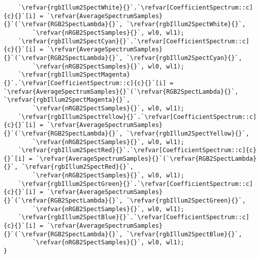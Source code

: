 \begin{lstlisting}
    `\refvar{rgbIllum2SpectWhite}{}`.`\refvar[CoefficientSpectrum::c]{c}{}`[i] = `\refvar{AverageSpectrumSamples}{}`(`\refvar{RGB2SpectLambda}{}`, `\refvar{rgbIllum2SpectWhite}{}`, 
        `\refvar{nRGB2SpectSamples}{}`, wl0, wl1);
    `\refvar{rgbIllum2SpectCyan}{}`.`\refvar[CoefficientSpectrum::c]{c}{}`[i] = `\refvar{AverageSpectrumSamples}{}`(`\refvar{RGB2SpectLambda}{}`, `\refvar{rgbIllum2SpectCyan}{}`, 
        `\refvar{nRGB2SpectSamples}{}`, wl0, wl1);
    `\refvar{rgbIllum2SpectMagenta}{}`.`\refvar[CoefficientSpectrum::c]{c}{}`[i] = `\refvar{AverageSpectrumSamples}{}`(`\refvar{RGB2SpectLambda}{}`, `\refvar{rgbIllum2SpectMagenta}{}`, 
        `\refvar{nRGB2SpectSamples}{}`, wl0, wl1);
    `\refvar{rgbIllum2SpectYellow}{}`.`\refvar[CoefficientSpectrum::c]{c}{}`[i] = `\refvar{AverageSpectrumSamples}{}`(`\refvar{RGB2SpectLambda}{}`, `\refvar{rgbIllum2SpectYellow}{}`, 
        `\refvar{nRGB2SpectSamples}{}`, wl0, wl1);
    `\refvar{rgbIllum2SpectRed}{}`.`\refvar[CoefficientSpectrum::c]{c}{}`[i] = `\refvar{AverageSpectrumSamples}{}`(`\refvar{RGB2SpectLambda}{}`, `\refvar{rgbIllum2SpectRed}{}`, 
        `\refvar{nRGB2SpectSamples}{}`, wl0, wl1);
    `\refvar{rgbIllum2SpectGreen}{}`.`\refvar[CoefficientSpectrum::c]{c}{}`[i] = `\refvar{AverageSpectrumSamples}{}`(`\refvar{RGB2SpectLambda}{}`, `\refvar{rgbIllum2SpectGreen}{}`, 
        `\refvar{nRGB2SpectSamples}{}`, wl0, wl1);
    `\refvar{rgbIllum2SpectBlue}{}`.`\refvar[CoefficientSpectrum::c]{c}{}`[i] = `\refvar{AverageSpectrumSamples}{}`(`\refvar{RGB2SpectLambda}{}`, `\refvar{rgbIllum2SpectBlue}{}`, 
        `\refvar{nRGB2SpectSamples}{}`, wl0, wl1);
}
\end{lstlisting}